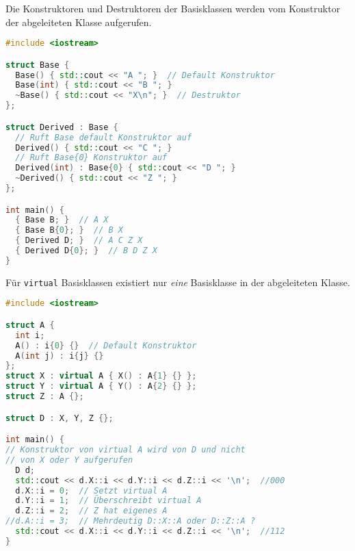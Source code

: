 Die Konstruktoren und Destruktoren der Basisklassen werden vom Konstruktor der
abgeleiteten Klasse aufgerufen.

\begin{lstlisting}[language=C++]
#include <iostream>

struct Base {
  Base() { std::cout << "A "; }  // Default Konstruktor
  Base(int) { std::cout << "B "; }
  ~Base() { std::cout << "X\n"; }  // Destruktor
};

struct Derived : Base {
  // Ruft Base default Konstruktor auf
  Derived() { std::cout << "C "; }
  // Ruft Base{0} Konstruktor auf
  Derived(int) : Base{0} { std::cout << "D "; }
  ~Derived() { std::cout << "Z "; }
};

int main() {
  { Base B; }  // A X
  { Base B{0}; }  // B X
  { Derived D; }  // A C Z X
  { Derived D{0}; }  // B D Z X
}
\end{lstlisting}

Für \lstinline|virtual| Basisklassen existiert nur \emph{eine} Basisklasse in
der abgeleiteten Klasse.

\begin{lstlisting}[language=C++]
#include <iostream>

struct A {
  int i;
  A() : i{0} {}  // Default Konstruktor
  A(int j) : i{j} {}
};
struct X : virtual A { X() : A{1} {} };
struct Y : virtual A { Y() : A{2} {} };
struct Z : A {};

struct D : X, Y, Z {};

int main() {
// Konstruktor von virtual A wird von D und nicht
// von X oder Y aufgerufen
  D d;
  std::cout << d.X::i << d.Y::i << d.Z::i << '\n';  //000
  d.X::i = 0;  // Setzt virtual A
  d.Y::i = 1;  // Überschreibt virtual A
  d.Z::i = 2;  // Z hat eigenes A
//d.A::i = 3;  // Mehrdeutig D::X::A oder D::Z::A ?
  std::cout << d.X::i << d.Y::i << d.Z::i << '\n';  //112
}
\end{lstlisting}

